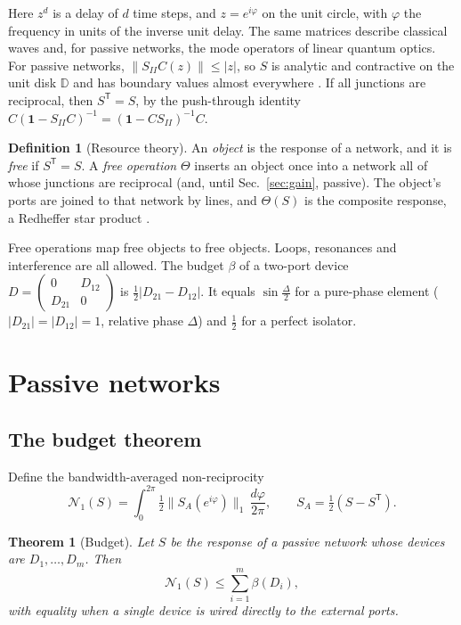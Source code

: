 \documentclass[aps,pra,twocolumn,superscriptaddress,floatfix,nofootinbib]{revtex4-2}
\newtheorem{theorem}{Theorem}
\theoremstyle{definition}
\newtheorem{definition}{Definition}
\newcommand{\NN}{\mathcal N_1}
\newcommand{\D}{\mathbb D}
\newcommand{\one}{\mathbf 1}
\newcommand{\T}{\mathsf T}
\begin{document}
Here $z^d$ is a delay of $d$ time steps, and $z=e^{i\varphi}$ on the unit circle, with $\varphi$ the frequency in units of the inverse unit delay. The same matrices describe classical waves and, for passive networks, the mode operators of linear quantum optics. For passive networks, $\|S_{II}C(z)\|\le|z|$, so $S$ is analytic and contractive on the unit disk $\D$ and has boundary values almost everywhere \cite{Gar07}. If all junctions are reciprocal, then $S^\T=S$, by the push-through identity $C(\one-S_{II}C)^{-1}=(\one-CS_{II})^{-1}C$.

\begin{definition}[Resource theory]
An \emph{object} is the response of a network, and it is \emph{free} if $S^\T=S$. A \emph{free operation} $\Theta$ inserts an object once into a network all of whose junctions are reciprocal (and, until Sec.~\ref{sec:gain}, passive). The object's ports are joined to that network by lines, and $\Theta(S)$ is the composite response, a Redheffer star product \cite{Red60}.
\end{definition}

Free operations map free objects to free objects. Loops, resonances and interference are all allowed. The budget $\beta$ of a two-port device $D=\left(\begin{smallmatrix}0&D_{12}\\D_{21}&0\end{smallmatrix}\right)$ is $\frac12|D_{21}-D_{12}|$. It equals $\sin\frac\Delta2$ for a pure-phase element ($|D_{21}|=|D_{12}|=1$, relative phase $\Delta$) and $\frac12$ for a perfect isolator.

\section{Passive networks}\label{sec:passive}

\subsection{The budget theorem}

Define the bandwidth-averaged non-reciprocity
\begin{equation}
\NN(S)=\int_0^{2\pi}\tfrac12\bigl\|S_A(e^{i\varphi})\bigr\|_1\,\frac{d\varphi}{2\pi},\qquad S_A=\tfrac12(S-S^\T).
\end{equation}

\begin{theorem}[Budget]\label{thm:budget}
Let $S$ be the response of a passive network whose devices are $D_1,\dots,D_m$. Then
\begin{equation}
\NN(S)\le\sum_{i=1}^m\beta(D_i),
\end{equation}
with equality when a single device is wired directly to the external ports.
\end{theorem}
\end{document}
